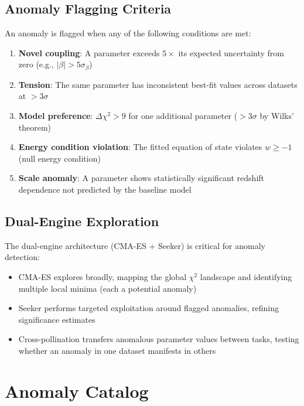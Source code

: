 \documentclass[twocolumn,showpacs,preprintnumbers,amsmath,amssymb,prl]{revtex4-2}
\begin{document}
\subsection{Anomaly Flagging Criteria}

An anomaly is flagged when any of the following conditions are met:

\begin{enumerate}
\item \textbf{Novel coupling}: A parameter exceeds $5\times$ its expected uncertainty from zero (e.g., $|\beta| > 5\sigma_\beta$)
\item \textbf{Tension}: The same parameter has inconsistent best-fit values across datasets at $>3\sigma$
\item \textbf{Model preference}: $\Delta\chi^2 > 9$ for one additional parameter ($>3\sigma$ by Wilks' theorem)
\item \textbf{Energy condition violation}: The fitted equation of state violates $w \geq -1$ (null energy condition)
\item \textbf{Scale anomaly}: A parameter shows statistically significant redshift dependence not predicted by the baseline model
\end{enumerate}

\subsection{Dual-Engine Exploration}

The dual-engine architecture (CMA-ES + Seeker) is critical for anomaly detection:

\begin{itemize}
\item CMA-ES explores broadly, mapping the global $\chi^2$ landscape and identifying multiple local minima (each a potential anomaly)
\item Seeker performs targeted exploitation around flagged anomalies, refining significance estimates
\item Cross-pollination transfers anomalous parameter values between tasks, testing whether an anomaly in one dataset manifests in others
\end{itemize}

\section{Anomaly Catalog}
\end{document}
